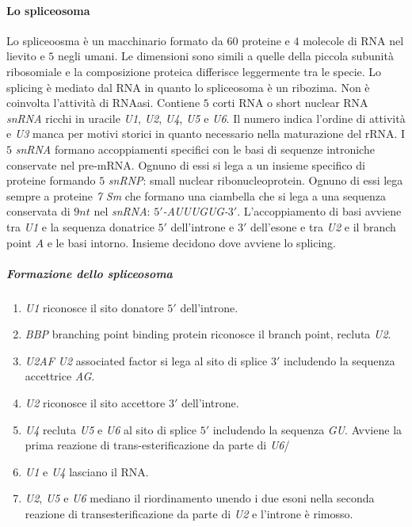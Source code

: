 \paragraph{Lo spliceosoma}
Lo spliceoosma \`e un macchinario formato da $60$ proteine e $4$ molecole di RNA nel lievito e $5$ negli umani. Le dimensioni sono simili a quelle della piccola subunit\`a ribosomiale
e la composizione proteica differisce leggermente tra le specie. Lo splicing \`e mediato dal RNA in quanto lo spliceosoma \`e un ribozima. Non \`e coinvolta l'attivit\`a di RNAasi. 
Contiene $5$ corti RNA o short nuclear RNA \emph{snRNA} ricchi in uracile \emph{U1}, \emph{U2}, \emph{U4}, \emph{U5} e \emph{U6}. Il numero indica l'ordine di attivit\`a e \emph{U3}
manca per motivi storici in quanto necessario nella maturazione del rRNA. I $5$ \emph{snRNA} formano accoppiamenti specifici con le basi di sequenze introniche conservate nel pre-mRNA. 
Ognuno di essi si lega a un insieme specifico di proteine formando $5$ \emph{snRNP}: small nuclear ribonucleoprotein. Ognuno di essi lega sempre a proteine \emph{7 Sm} che formano una
ciambella che si lega a una sequenza conservata di $9nt$  nel \emph{snRNA}: \emph{$5'$-AUUUGUG-$3'$}. L'accoppiamento di basi avviene tra \emph{U1} e la sequenza donatrice $5'$
dell'introne e $3'$ dell'esone e tra \emph{U2} e il branch point $A$ e le basi intorno. Insieme decidono dove avviene lo splicing.
\subparagraph{Formazione dello spliceosoma}
\begin{enumerate}
	\item \emph{U1} riconosce il sito donatore $5'$ dell'introne.
	\item \emph{BBP} branching point binding protein riconosce il branch point, recluta \emph{U2}.
	\item \emph{U2AF} \emph{U2} associated factor si lega al sito di splice $3'$ includendo la sequenza accettrice \emph{AG}.
	\item \emph{U2} riconosce il sito accettore $3'$ dell'introne. 
	\item \emph{U4} recluta \emph{U5} e \emph{U6} al sito di splice $5'$ includendo la sequenza \emph{GU}. Avviene la prima reazione di trans-esterificazione da parte di \emph{U6}/
	\item \emph{U1} e \emph{U4} lasciano il RNA. 
	\item \emph{U2}, \emph{U5} e \emph{U6} mediano il riordinamento unendo i due esoni nella seconda reazione di transesterificazione da parte di \emph{U2} e l'introne \`e rimosso.
\end{enumerate}
